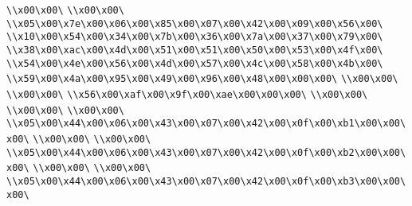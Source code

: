 \verb|\\x00\x00\|\newline
\verb|\\x00\x00\|\newline
\verb|\\x05\x00\x7e\x00\x06\x00\x85\x00\x07\x00\x42\x00\x09\x00\x56\x00\|\newline
\verb|\\x10\x00\x54\x00\x34\x00\x7b\x00\x36\x00\x7a\x00\x37\x00\x79\x00\|\newline
\verb|\\x38\x00\xac\x00\x4d\x00\x51\x00\x51\x00\x50\x00\x53\x00\x4f\x00\|\newline
\verb|\\x54\x00\x4e\x00\x56\x00\x4d\x00\x57\x00\x4c\x00\x58\x00\x4b\x00\|\newline
\verb|\\x59\x00\x4a\x00\x95\x00\x49\x00\x96\x00\x48\x00\x00\x00\|\newline
\verb|\\x00\x00\|\newline
\verb|\\x00\x00\|\newline
\verb|\\x56\x00\xaf\x00\x9f\x00\xae\x00\x00\x00\|\newline
\verb|\\x00\x00\|\newline
\verb|\\x00\x00\|\newline
\verb|\\x00\x00\|\newline
\verb|\\x05\x00\x44\x00\x06\x00\x43\x00\x07\x00\x42\x00\x0f\x00\xb1\x00\x00\x00\|\newline
\verb|\\x00\x00\|\newline
\verb|\\x00\x00\|\newline
\verb|\\x05\x00\x44\x00\x06\x00\x43\x00\x07\x00\x42\x00\x0f\x00\xb2\x00\x00\x00\|\newline
\verb|\\x00\x00\|\newline
\verb|\\x00\x00\|\newline
\verb|\\x05\x00\x44\x00\x06\x00\x43\x00\x07\x00\x42\x00\x0f\x00\xb3\x00\x00\x00\|\newline
